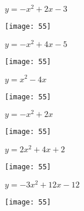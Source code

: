 \documentclass[a4paper]{oblivoir}
\begin{document}
\clearpage
\begin{minipage}{0.45\textwidth}\centering
\(y=-x^2+2x-3\)
\par\bigskip\texttt{[image: 55]}
\end{minipage}
\begin{minipage}{0.45\textwidth}\centering
\(y=-x^2+4x-5\)
\par\bigskip\texttt{[image: 55]}
\end{minipage}\bigskip\bigskip\par
\begin{minipage}{0.45\textwidth}\centering
\(y=x^2-4x\)
\par\bigskip\texttt{[image: 55]}
\end{minipage}
\begin{minipage}{0.45\textwidth}\centering
\(y=-x^2+2x\)
\par\bigskip\texttt{[image: 55]}
\end{minipage}\bigskip\bigskip\par
\begin{minipage}{0.45\textwidth}\centering
\(y=2x^2+4x+2\)
\par\bigskip\texttt{[image: 55]}
\end{minipage}
\begin{minipage}{0.45\textwidth}\centering
\(y=-3x^2+12x-12\)
\par\bigskip\texttt{[image: 55]}
\end{minipage}\bigskip\bigskip\par
\end{document}
